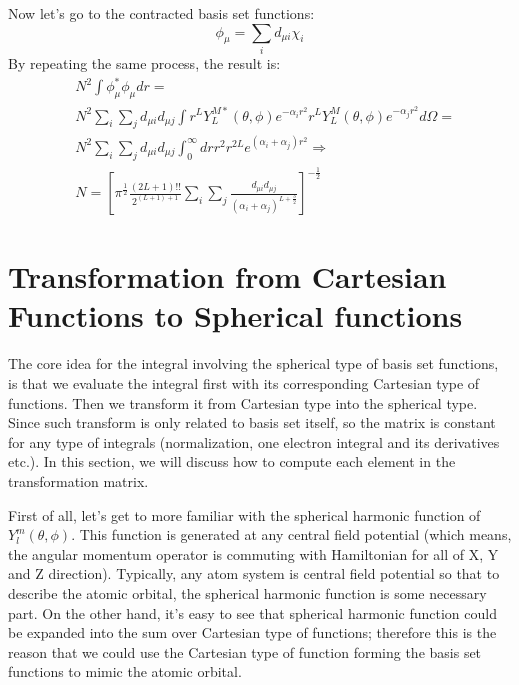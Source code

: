 Now let's go to the contracted basis set functions:
\begin{equation}
 \label{int_norm_eq:6}
\phi_{\mu} = \sum_{i}d_{\mu i}\chi_{i}
\end{equation}
By repeating the same process, the result is:
\begin{equation}
 \begin{split}
&N^{2}\int \phi_{\mu}^{*}\phi_{\mu} dr =\\
& N^{2}\sum_{i}\sum_{j}d_{\mu i}d_{\mu j}
\int r^{L}Y_{L}^{M*}(\theta,\phi)e^{-\alpha_{i} r^{2}} 
r^{L}Y_{L}^{M}(\theta,\phi)e^{-\alpha_{j} r^{2}} d\Omega =   \\
&N^{2}\sum_{i}\sum_{j}d_{\mu i}d_{\mu j}
\int_{0}^{\infty} dr r^{2}r^{2L}e^{(\alpha_{i}+\alpha_{j}) r^{2}} \Rightarrow \\
&N =  \left[ \pi^{\frac{1}{2}}\frac{(2L+1)!!}{2^{(L+1)+1}}
\sum_{i}\sum_{j}\frac{d_{\mu i}d_{\mu j}}{(\alpha_{i}+\alpha_{j})^{L+\frac{3}{2}}}
\right]^{-\frac{1}{2}}
 \end{split}
\label{int_norm_eq:7}
\end{equation}


\section{Transformation from Cartesian Functions to Spherical functions}
\label{Transformation_Cart_sphere}
%
%
%
The core idea for the integral involving the spherical type of basis set functions, is that
we evaluate the integral first with its corresponding Cartesian type of functions. Then we 
transform it from Cartesian type into the spherical type. Since such transform is only related
to basis set itself, so the matrix is constant for any type of integrals (normalization, one 
electron integral and its derivatives etc.). In this section, we will discuss how to 
compute each element in the transformation matrix.

First of all, let's get to more familiar with the spherical harmonic function of 
$Y^{m}_{l}(\theta,\phi)$. This function is generated at any central field potential (which means,
the angular momentum operator is commuting with Hamiltonian for all of X, Y and Z direction). 
Typically,  any atom system is central field potential so that to describe the atomic orbital,
the spherical harmonic function is some necessary part. On the other hand, it's easy to see
that spherical harmonic function could be expanded into the sum over Cartesian type of functions;
therefore this is the reason that we could use the Cartesian type of function forming the basis 
set functions to mimic the atomic orbital.

